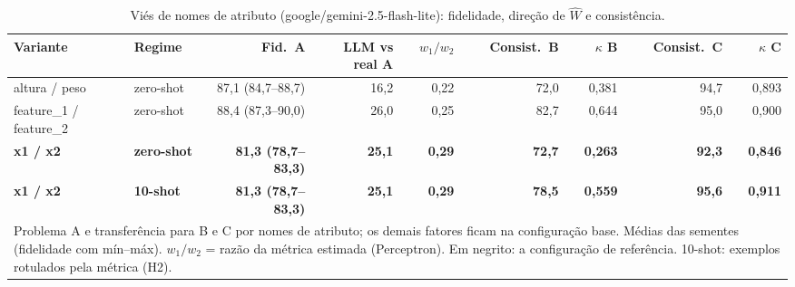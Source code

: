 \begin{table}[htbp]
\centering
\small
\caption{Viés de nomes de atributo (google/gemini-2.5-flash-lite): fidelidade, direção de $\hat{W}$ e consistência.}
\label{tab:bloco1_vies_nomes_atributo_flashlite}
\begin{tabular}{llrrrrrrr}
\toprule
Variante & Regime & Fid.\ A & LLM vs real A & $w_1/w_2$ & Consist.\ B & $\kappa$ B & Consist.\ C & $\kappa$ C \\
\midrule
altura / peso & zero-shot & 87,1 (84,7–88,7) & 16,2 & 0,22 & 72,0 & 0,381 & 94,7 & 0,893 \\
feature\_1 / feature\_2 & zero-shot & 88,4 (87,3–90,0) & 26,0 & 0,25 & 82,7 & 0,644 & 95,0 & 0,900 \\
\textbf{x1 / x2} & \textbf{zero-shot} & \textbf{81,3 (78,7–83,3)} & \textbf{25,1} & \textbf{0,29} & \textbf{72,7} & \textbf{0,263} & \textbf{92,3} & \textbf{0,846} \\
\midrule
\textbf{x1 / x2} & \textbf{10-shot} & \textbf{81,3 (78,7–83,3)} & \textbf{25,1} & \textbf{0,29} & \textbf{78,5} & \textbf{0,559} & \textbf{95,6} & \textbf{0,911} \\
\bottomrule
\multicolumn{9}{p{0.95\linewidth}}{\footnotesize Problema A e transferência para B e C por nomes de atributo; os demais fatores ficam na configuração base. Médias das sementes (fidelidade com mín–máx). $w_1/w_2$ = razão da métrica estimada (Perceptron). Em negrito: a configuração de referência. 10-shot: exemplos rotulados pela métrica (H2).} \\
\end{tabular}
\end{table}
